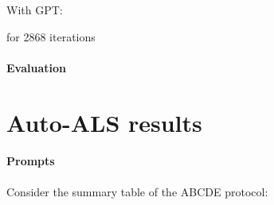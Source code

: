 With GPT:



for 2868 iterations

\paragraph{Evaluation}



\newpage
\section{Auto-ALS results}

\paragraph{Prompts}

Consider the summary table of the ABCDE protocol:

